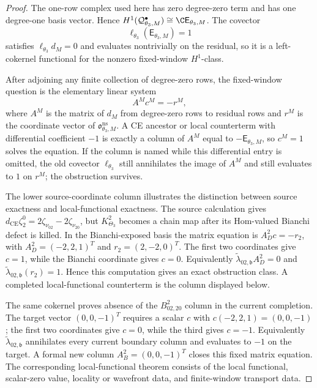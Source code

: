 \documentclass[11pt]{memoir}
\begin{document}
\begin{proof}
  The one-row complex used here has zero degree-zero term and has
  one degree-one basis vector.  Hence
  \(H^1(\mathcal Q^\bullet_{\theta_3,M})\cong
  \C\mathsf E_{\theta_3,M}\).  The covector
  \[
    \ell_{\theta_3}(\mathsf E_{\theta_3,M})=1
  \]
  satisfies \(\ell_{\theta_3}d_M=0\) and evaluates nontrivially on the
  residual, so it is a left-cokernel functional for the nonzero
  fixed-window \(H^1\)-class.

  After adjoining any finite collection of degree-zero rows,
  the fixed-window question is the elementary linear system
  \[
    A^Mc^M=-r^M,
  \]
  where \(A^M\) is the matrix of \(d_M\) from degree-zero rows to residual
  rows and \(r^M\) is the coordinate vector of
  \(\mathfrak o^{\mathrm{ns}}_{\theta_3,M}\).  A CE ancestor or local
  counterterm with differential coefficient \(-1\) is exactly a column
  of \(A^M\) equal to \(-\mathsf E_{\theta_3,M}\), so \(c^M=1\) solves
  the equation.  If the column is named while this differential entry is
  omitted, the old covector \(\ell_{\theta_3}\) still annihilates the
  image of \(A^M\) and still evaluates to \(1\) on \(r^M\); the
  obstruction survives.

  The lower source-coordinate column illustrates the distinction
  between source exactness and local-functional exactness.  The source
  calculation gives
  \(d_{\mathrm{CE}}\zeta^0_2=2\zeta_{\nu_{02}}-2\zeta_{\nu_{20}}\), but
  \(K^2_{\Theta_3}\) becomes a chain map after its Hom-valued Bianchi
  defect is killed.  In the Bianchi-exposed basis the matrix equation is
  \(A_D^2c=-r_2\), with \(A_D^2=(-2,2,1)^T\) and \(r_2=(2,-2,0)^T\).
  The first two coordinates give \(c=1\), while the Bianchi coordinate
  gives \(c=0\).  Equivalently
  \(\widetilde\lambda_{02,\mathfrak b}A_D^2=0\) and
  \(\widetilde\lambda_{02,\mathfrak b}(r_2)=1\).  Hence this computation
	  gives an exact obstruction class. A completed local-functional
	  counterterm is the column displayed below.

  The same cokernel proves absence of the \(B^2_{02,20}\) column in the
  current completion.  The target vector \((0,0,-1)^T\) requires a
  scalar \(c\) with \(c(-2,2,1)=(0,0,-1)\); the first two coordinates
  give \(c=0\), while the third gives \(c=-1\).  Equivalently
  \(\widetilde\lambda_{02,\mathfrak b}\) annihilates every current
  boundary column and evaluates to \(-1\) on the target.  A formal new
  column \(A_B^2=(0,0,-1)^T\) closes this fixed matrix equation.  The
  corresponding local-functional theorem consists of the local
  functional, scalar-zero value, locality or wavefront data, and
  finite-window transport data.


\end{proof}
\end{document}
